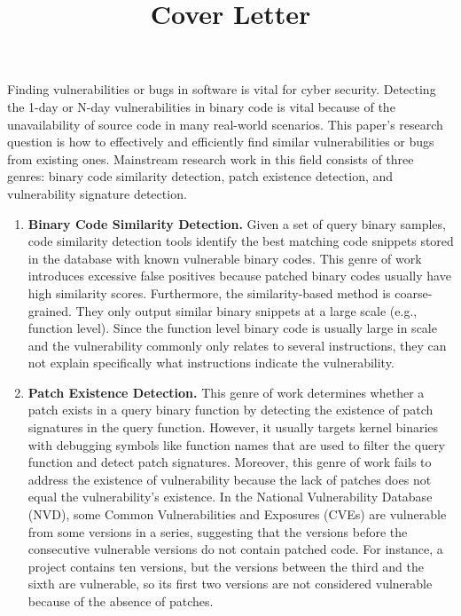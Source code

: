 \documentclass[lettersize,journal]{IEEEtran}
\title{Cover Letter}
\begin{document}
\maketitle
Finding vulnerabilities or bugs in software is vital for cyber security. 
Detecting the 1-day or N-day vulnerabilities in binary code
is vital because of the unavailability of source code in many
real-world scenarios. This paper’s research question is how to
effectively and efficiently find similar vulnerabilities or bugs
from existing ones. Mainstream research work in this field
consists of three genres: binary code similarity detection, patch
existence detection, and vulnerability signature detection.

\begin{enumerate}
    

\item \textbf{Binary Code Similarity Detection.} Given a set of
query binary samples, code similarity detection tools identify the best matching code snippets stored in
the database with known vulnerable binary codes. 
This genre of work introduces excessive false positives because patched binary codes usually have high similarity scores. Furthermore, the similarity-based method is
coarse-grained. They only output similar binary snippets
at a large scale (e.g., function level). Since the function
level binary code is usually large in scale and the vulnerability commonly only relates to several instructions, they
can not explain specifically what instructions indicate the
vulnerability.

\item \textbf{Patch Existence Detection.} This genre of work determines whether a patch exists in a query binary function by detecting the existence of patch signatures
in the query function. However, it usually targets kernel
binaries with debugging symbols like function names
that are used to filter the query function and detect
patch signatures. Moreover, this genre of work fails to
address the existence of vulnerability because the lack
of patches does not equal the vulnerability’s existence.
In the National Vulnerability Database (NVD), some
Common Vulnerabilities and Exposures (CVEs) are vulnerable from some versions in a series, suggesting that
the versions before the consecutive vulnerable versions do
not contain patched code. For instance, a project contains
ten versions, but the versions between the third and the
sixth are vulnerable, so its first two versions are not
considered vulnerable because of the absence of patches.


\end{enumerate}
\end{document}
